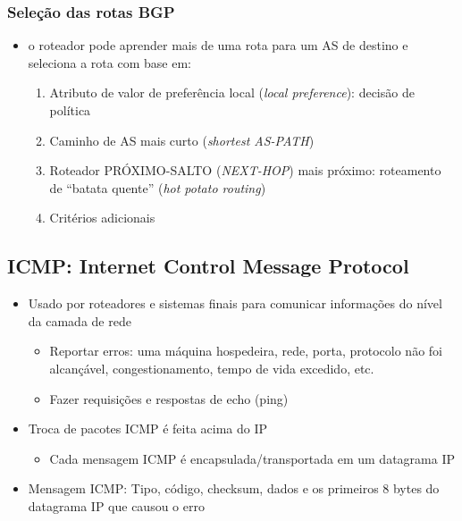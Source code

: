         \subsubsection*{Seleção das rotas BGP}

            \begin{itemize}[left=0.5cm, align=left, nosep]
                \item o roteador pode aprender mais de uma rota para um AS de destino e seleciona a rota com base em:
                \begin{enumerate}[left=0.5cm, align=left, nosep]
                    \item Atributo de valor de preferência local (\textit{local preference}): decisão de política
                    \item Caminho de AS mais curto (\textit{shortest AS-PATH})
                    \item Roteador PRÓXIMO-SALTO (\textit{NEXT-HOP}) mais próximo: roteamento de ``batata quente'' (\textit{hot potato routing})
                    \item Critérios adicionais
                \end{enumerate}
            \end{itemize}

    \subsection{ICMP: Internet Control Message Protocol}
        
        \begin{itemize}[left=0.5cm, align=left, nosep]
            \item Usado por roteadores e sistemas finais para comunicar informações do nível da camada de rede 
            \begin{itemize}[left=0.5cm, nosep, label=$\hookrightarrow$]
                \item Reportar erros: uma máquina hospedeira, rede, porta, protocolo não foi alcançável, congestionamento, tempo de vida excedido, etc.
                \item Fazer requisições e respostas de echo (ping)   
            \end{itemize}
            \item Troca de pacotes ICMP é feita acima do IP
            \begin{itemize}[left=0.5cm, nosep, label=$\hookrightarrow$]
                \item Cada mensagem ICMP é encapsulada/transportada em um datagrama IP   
            \end{itemize}
            \item Mensagem ICMP: Tipo, código, checksum, dados e os primeiros 8 bytes do datagrama IP que causou o erro
        \end{itemize}

